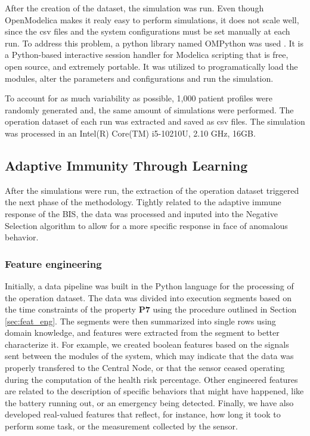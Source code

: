 After the creation of the dataset, the simulation was run. Even though OpenModelica makes it realy easy to perform simulations, it does not scale well, since the csv files and the system configurations must be set manually at each run. To address this problem, a python library named OMPython was used \cite{OMPython}. It is a Python-based interactive session handler for Modelica scripting that is free, open source, and extremely portable. It was utilized to programatically load the modules, alter the parameters and configurations and run the simulation.

To account for as much variability as possible, 1,000 patient profiles were randomly generated and, the same amount of simulations were performed. The operation dataset of each run was extracted and saved as csv files. The simulation was processed in an Intel(R) Core(TM) i5-10210U, 2.10 GHz, 16GB.

\subsection{Adaptive Immunity Through Learning}

After the simulations were run, the extraction of the operation dataset triggered the next phase of the methodology. Tightly related to the adaptive immune response of the BIS, the data was processed and inputed into the Negative Selection algorithm to allow for a more specific response in face of anomalous behavior.

\subsubsection{Feature engineering}

Initially, a data pipeline was built in the Python language for the processing of the operation dataset. The data was divided into execution segments based on the time constraints of the property \textbf{P7} using the procedure outlined in Section \ref{sec:feat_eng}. The segments were then summarized into single rows using domain knowledge, and features were extracted from the segment to better characterize it. For example, we created boolean features based on the signals sent between the modules of the system, which may indicate that the data was properly transfered to the Central Node, or that the sensor ceased operating during the computation of the health risk percentage. Other engineered features are related to the description of specific behaviors that might have happened, like the battery running out, or an emergency being detected. Finally, we have also developed real-valued features that reflect, for instance, how long it took to perform some task, or the measurement collected by the sensor.

